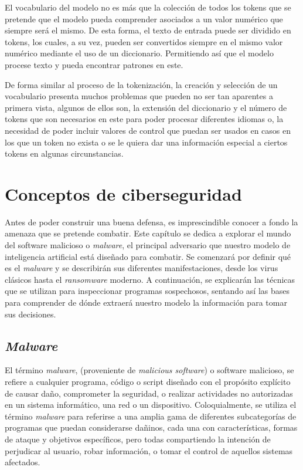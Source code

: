 El vocabulario del modelo no es más que la colección de todos los tokens que se pretende que el modelo pueda comprender asociados a un valor numérico que siempre será el mismo. De esta forma, el texto de entrada puede ser dividido en tokens, los cuales, a su vez, pueden ser convertidos siempre en el mismo valor numérico mediante el uso de un diccionario. Permitiendo así que el modelo procese texto y pueda encontrar patrones en este.

De forma similar al proceso de la tokenización, la creación y selección de un vocabulario presenta muchos problemas que pueden no ser tan aparentes a primera vista, algunos de ellos son, la extensión del diccionario y el número de tokens que son necesarios en este para poder procesar diferentes idiomas o, la necesidad de poder incluir valores de control que puedan ser usados en casos en los que un token no exista o se le quiera dar una información especial a ciertos tokens en algunas circunstancias.

\section{Conceptos de ciberseguridad}

Antes de poder construir una buena defensa, es imprescindible conocer a fondo la amenaza que se pretende combatir. Este capítulo se dedica a explorar el mundo del software malicioso o \textit{malware}, el principal adversario que nuestro modelo de inteligencia artificial está diseñado para combatir. Se comenzará por definir qué es el \textit{malware} y se describirán sus diferentes manifestaciones, desde los virus clásicos hasta el \textit{ransomware} moderno. A continuación, se explicarán las técnicas que se utilizan para inspeccionar programas sospechosos, sentando así las bases para comprender de dónde extraerá nuestro modelo la información para tomar sus decisiones.

\subsection{\textit{Malware}}

El término \textit{malware}, (proveniente de \textit{malicious software}) o software malicioso, se refiere a cualquier programa, código o script diseñado con el propósito explícito de causar daño, comprometer la seguridad, o realizar actividades no autorizadas en un sistema informático, una red o un dispositivo. Coloquialmente, se utiliza el término \textit{malware} para referirse a una amplia gama de diferentes subcategorías de programas que puedan considerarse dañinos, cada una con características, formas de ataque y objetivos específicos, pero todas compartiendo la intención de perjudicar al usuario, robar información, o tomar el control de aquellos sistemas afectados.

